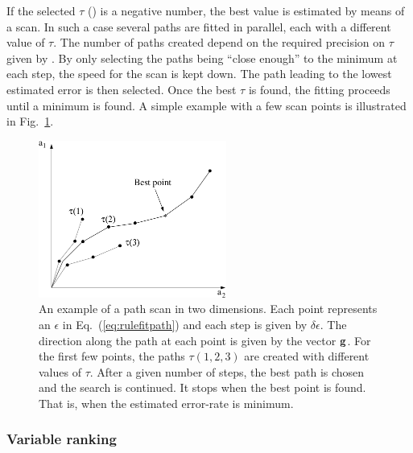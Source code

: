 If the selected $\tau$ () is a negative number, the best value is 
estimated by means of a scan. In such a case several paths are fitted in parallel, 
each with a different value of $\tau$. The number of paths created depend on the 
required precision on $\tau$ given by . By only selecting the 
paths being ``close enough'' to the minimum at each step, the speed for 
the scan is kept down.
The path leading to the lowest estimated error is then selected.
Once the best $\tau$ is found, the fitting proceeds until a minimum is found.
A simple example with a few scan points is illustrated 
in Fig.~\ref{fig:rulefitpath}.
\begin{figure}[t]
  \begin{center}
          \includegraphics[width=0.55\textwidth]{plots/rulefitpath}
  \end{center}
  \vspace{-0.3cm}
  \caption[.]{An example of a path scan in two dimensions. Each point represents 
              an $\epsilon$ in Eq.~(\ref{eq:rulefitpath}) and each step is given by 
              $\delta\epsilon$. The direction along the path at each point is given 
              by the vector ${\bf g}$. For the first few points, the paths $\tau(1,2,3)$ 
              are created with different values of $\tau$. After a given number of 
              steps, the best path is chosen and the search is continued. It stops 
              when the best point is found. That is, when the estimated error-rate 
              is minimum.}
\label{fig:rulefitpath}
\end{figure}

\subsubsection{Variable ranking}

